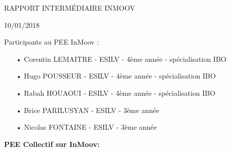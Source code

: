 \documentclass[12pt, oneside]{article}
\newcommand{\type}{10/01/2018}	%
\newcommand{\titre}{Rapport intermédiaire InMoov}
\begin{document}
\pagestyle{style}

\begin{center}
\begin{minipage}{0.75\linewidth}
\begin{center}
\centering
   
\vspace{3cm}
\colorbox{gristitle}{
\begin{minipage}{\textwidth}
    \begin{center}
    	\vspace{0.5cm}
    	{\color{bleu} \uppercase{\Huge {\titre}}}
    	\vspace{0.25cm}\linebreak
		\par \color{gris} {\Large \type}	
	\end{center}    
\end{minipage}    
}

\vspace{2.5cm}

\color{bleu} {\Large Participants au PEE InMoov  : \par}
\end{center}

\vspace{0.5cm}
\begin{itemize}
\item[•] Corentin LEMAITRE - ESILV - 4ème année - spécialisation IBO
\item[•] Hugo POUSSEUR - ESILV - 4ème année - spécialisation IBO
\item[•] Rabah HOUAOUI - ESILV - 4ème année - spécialisation IBO
\item[•] Brice PARILUSYAN - ESILV - 3ème année
\item[•] Nicolas FONTAINE - ESILV - 3ème année
\end{itemize}

\end{minipage}
\end{center}

\newpage


\textcolor{bleu}{\Large{\textbf{PEE Collectif sur InMoov:}}}
\vspace{0.5cm}
\end{document}
